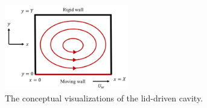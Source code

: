 \begin{figure}[t]
  \vspace{-7mm}
  \centering
  \includegraphics[width=0.48\textwidth]{imgs/lid-driven-cavity.pdf}
  \vspace{-3mm}
  \caption{The conceptual visualizations of the lid-driven cavity.}
  \label{lid-driven-cavity-conceptual}
  \vspace{-3mm}
\end{figure}

